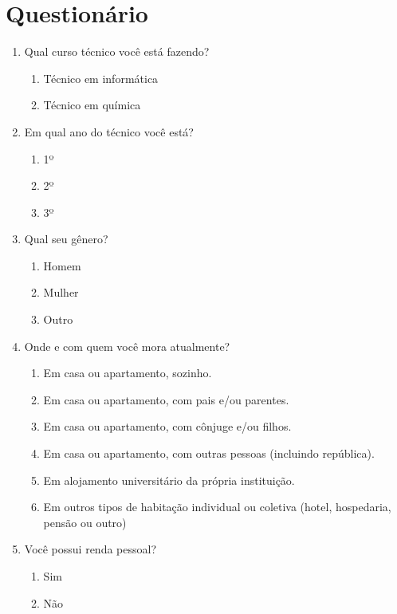 \appendix
\chapter{Questionário}\label{Questionario}

\begin{enumerate}[noitemsep]
    \item Qual curso técnico você está fazendo?
    \begin{enumerate}[noitemsep]
        \item Técnico em informática
        \item Técnico em química
    \end{enumerate}
    \item Em qual ano do técnico você está?
    \begin{enumerate}[noitemsep]
        \item 1º
        \item 2º
        \item 3º
    \end{enumerate}
    \item Qual seu gênero?
    \begin{enumerate}[noitemsep]
        \item Homem
        \item Mulher
        \item Outro
    \end{enumerate}
    \item Onde e com quem você mora atualmente?
    \begin{enumerate}[noitemsep]
        \item Em casa ou apartamento, sozinho.
        \item Em casa ou apartamento, com pais e/ou parentes.
        \item Em casa ou apartamento, com cônjuge e/ou filhos.
        \item Em casa ou apartamento, com outras pessoas (incluindo república).
        \item Em alojamento universitário da própria instituição.
        \item Em outros tipos de habitação individual ou coletiva (hotel, hospedaria, pensão ou outro)
    \end{enumerate}
    \item Você possui renda pessoal?
    \begin{enumerate}[noitemsep]
        \item Sim
        \item Não

\end{enumerate}
\end{enumerate}
